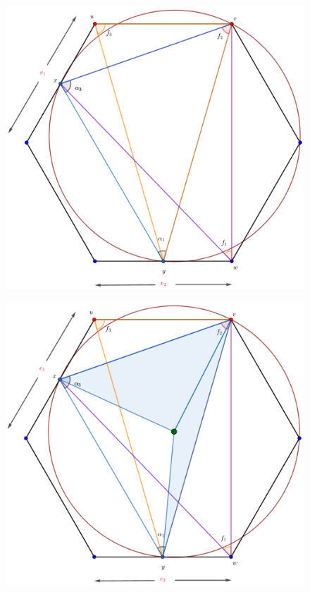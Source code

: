 {\begin{frame}
  \begin{figure}
    \centering
    \includegraphics[width=.65 \paperwidth]{./images/Bosquejo6.png}
  \end{figure}
\end{frame} 

\begin{frame}
  \begin{figure}
    \centering
    \includegraphics[width=.65 \paperwidth]{./images/Bosquejo7.png}
  \end{figure}
\end{frame} 

}
